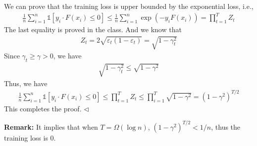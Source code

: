 \documentclass[11pt]{article}
\newenvironment{answer}[1][Solution]{\begin{trivlist}
\item[\hskip \labelsep {\bfseries #1.}\hskip \labelsep]}{\hfill$\lhd$\end{trivlist}}
\newcommand\1{\mathds{1}}
\begin{document}
\begin{answer}
    We can prove that the training loss is upper bounded by the exponential loss, i.e.,
    \begin{align*}
        \frac{1}{n} \sum_{i=1}^{n} \1[y_i \cdot F(x_i) \le 0] \le \frac{1}{n} \sum_{i=1}^{n} \exp(-y_i F(x_i)) = \prod_{t=1}^{T}Z_t
    \end{align*}
    The last equality is proved in the class. And we know that
    \begin{align*}
        Z_t = 2\sqrt{\varepsilon_t(1-\varepsilon_t)} = \sqrt{1 - \gamma_t^2}
    \end{align*}
    Since $\gamma_t \ge \gamma > 0$, we have 
    \begin{align*}
        \sqrt{1 - \gamma_t^2} \le \sqrt{1 - \gamma^2}
    \end{align*}
    Thus, we have
    \begin{align*}
        \frac{1}{n} \sum_{i=1}^{n} \1[y_i \cdot F(x_i) \le 0] \le \prod_{t=1}^{T}Z_t  \le \prod_{i=1}^{T} \sqrt{1 - \gamma^2} = (1 - \gamma^2)^{T/2}
    \end{align*}
    This completes the proof.
\end{answer}
\textbf{Remark:} It implies that when $T = \Omega(\log n)$, $(1 - \gamma^2)^{T/2} < 1/n$, thus the training loss is 0.
\end{document}
